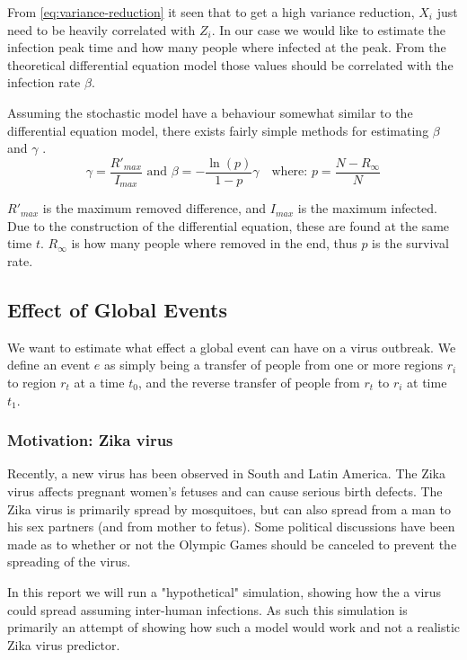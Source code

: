 From \eqref{eq:variance-reduction} it seen that to get a high variance reduction, $X_i$ just need to be heavily correlated with $Z_i$. In our case we would like to estimate the infection peak time and how many people where infected at the peak. From the theoretical differential equation model those values should be correlated with the infection rate $\beta$.

Assuming the stochastic model have a behaviour somewhat similar to the differential equation model, there exists fairly simple methods for estimating $\beta$ and $\gamma$ \cite{wiki-sir}.
\begin{equation}
\gamma = \frac{R'_{max}}{I_{max}} \text{ and } \beta = -\frac{\ln(p)}{1 - p} \gamma \quad \text{where: } p = \frac{N - R_\infty}{N} 
\end{equation}

$R'_{max}$ is the maximum removed difference, and $I_{max}$ is the maximum infected. Due to the construction of the differential equation, these are found at the same time $t$. $R_\infty$ is how many people where removed in the end, thus $p$ is the survival rate.

\subsection{Effect of Global Events}
We want to estimate what effect a global event can have on a virus outbreak. We define an event $e$ as simply being a transfer of people from one or more regions $r_{i}$ to region $r_t$ at a time $t_0$, and the reverse transfer of people from $r_t$ to $r_{i}$ at time $t_1$.

\subsubsection{Motivation: Zika virus}
Recently, a new virus has been observed in South and Latin America. The Zika virus affects pregnant women's fetuses and can cause serious birth defects. The Zika virus is primarily spread by mosquitoes, but can also spread from a man to his sex partners (and from mother to fetus). Some political discussions have been made as to whether or not the Olympic Games should be canceled to prevent the spreading of the virus.

In this report we will run a "hypothetical" simulation, showing how the a virus could spread assuming inter-human infections. As such this simulation is primarily an attempt of showing how such a model would work and not a realistic Zika virus predictor.

